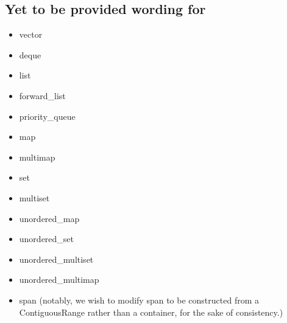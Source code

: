 \documentclass{wg21}
\begin{document}
\subsection{Yet to be provided wording for}

\begin{itemize}
	\item vector
	\item deque
	\item list
	\item forward_list
	\item priority_queue
	\item map
	\item multimap
	\item set
	\item multiset
	\item unordered_map
	\item unordered_set
	\item unordered_multiset
	\item unordered_multimap
	\item span (notably, we wish to modify span to be constructed from a ContiguousRange rather than a container, for the sake of consistency.)
\end{itemize}
\end{document}
